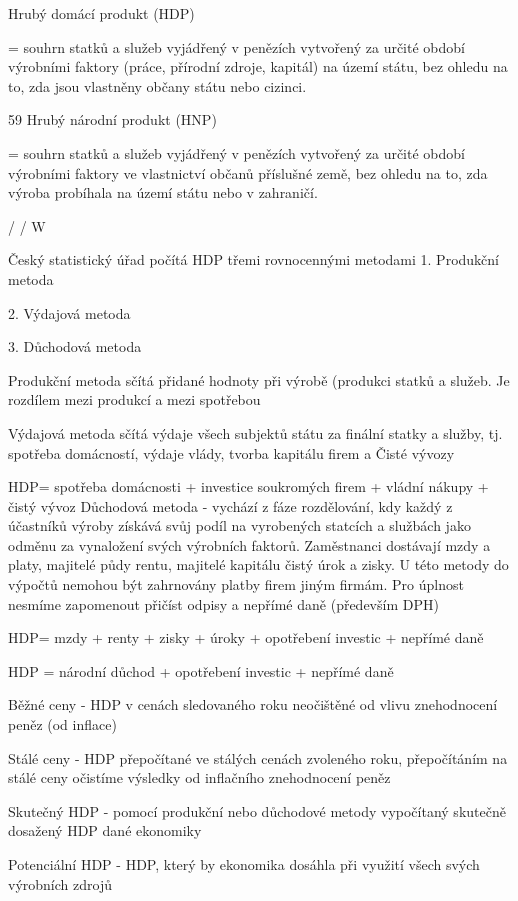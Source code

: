 Hrubý domácí produkt (HDP)

= souhrn statků a služeb vyjádřený v penězích vytvořený za určité období výrobními faktory
(práce, přírodní zdroje, kapitál) na území státu, bez ohledu na to, zda jsou vlastněny občany
státu nebo cizinci.

59
\newpage
Hrubý národní produkt (HNP)

= souhrn statků a služeb vyjádřený v penězích vytvořený za určité období výrobními faktory
ve vlastnictví občanů příslušné země, bez ohledu na to, zda výroba probíhala na území státu
nebo v zahraničí.

/ / W

Český statistický úřad počítá HDP třemi rovnocennými metodami
1. Produkční metoda

2. Výdajová metoda

3. Důchodová metoda

Produkční metoda sčítá přidané hodnoty při výrobě (produkci statků a služeb. Je rozdílem
mezi produkcí a mezi spotřebou

Výdajová metoda sčítá výdaje všech subjektů státu za finální statky a služby, tj. spotřeba
domácností, výdaje vlády, tvorba kapitálu firem a Čisté vývozy

HDP= spotřeba domácnosti + investice soukromých firem + vládní nákupy + čistý vývoz
Důchodová metoda - vychází z fáze rozdělování, kdy každý z účastníků výroby získává svůj
podíl na vyrobených statcích a službách jako odměnu za vynaložení svých výrobních faktorů.
Zaměstnanci dostávají mzdy a platy, majitelé půdy rentu, majitelé kapitálu čistý úrok a zisky.
U této metody do výpočtů nemohou být zahrnovány platby firem jiným firmám. Pro úplnost
nesmíme zapomenout přičíst odpisy a nepřímé daně (především DPH)

HDP= mzdy + renty + zisky + úroky + opotřebení investic + nepřímé daně

HDP = národní důchod + opotřebení investic + nepřímé daně

Běžné ceny - HDP v cenách sledovaného roku neočištěné od vlivu znehodnocení peněz (od
inflace)

Stálé ceny - HDP přepočítané ve stálých cenách zvoleného roku, přepočítáním na stálé ceny
očistíme výsledky od inflačního znehodnocení peněz

Skutečný HDP - pomocí produkční nebo důchodové metody vypočítaný skutečně dosažený
HDP dané ekonomiky

Potenciální HDP - HDP, který by ekonomika dosáhla při využití všech svých výrobních
zdrojů

